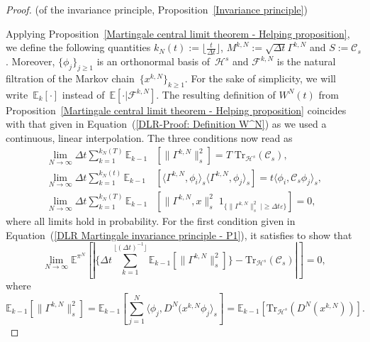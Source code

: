 \begin{proof}(of the invariance principle, Proposition~\ref{Invariance principle})
  
  Applying Proposition~\ref{Martingale central limit theorem - Helping proposition}, we define the following quantities $ k_N(t) := \lfloor \frac{t}{\Delta t} \rfloor $, $ M^{k,N} := \sqrt{\Delta t} \Gamma^{k,N} $ and $ S := \mathcal{C}_s $. Moreover, $\{ \phi_j \}_{j \geq 1}$ is an orthonormal basis of~$\mathcal{H}^s$ and $\mathcal{F}^{k,N}$ is the natural filtration of the Markov chain~$ \{ x^{k,N} \} _{k \geq 1}$. For the sake of simplicity, we will write~$\mathbb{E}_k[\cdot]$ instead of~$\mathbb{E}[\cdot |\mathcal{F}^{k,N}]$.  The resulting definition of $ W^{N}(t) $ from Proposition~\ref{Martingale central limit theorem - Helping proposition} coincides with that given in Equation~(\ref{DLR-Proof: Definition W^N}) as we used a continuous, linear interpolation. The three conditions now read as
    \begin{align}
      \lim_{N \to \infty} \Delta t \sum_{k=1}^{k_{N}(T)} \mathbb{E}_{k-1} &\left[ \| \Gamma^{k,N} \|_{s}^{2}  \right] = T \; \text{Tr}_{\mathcal{H}^s}(\mathcal{C}_s), \label{DLR Martingale invariance principle - P1}\\
      \lim_{N \to \infty} \Delta t \sum_{k=1}^{k_{N}(t)} \mathbb{E}_{k-1} &\left[ \langle  \Gamma^{k,N} , \phi_i \rangle_{s} \langle  \Gamma^{k,N} , \phi_j \rangle_{s}  \right] = t \langle  \phi_i , \mathcal{C}_s \phi_j \rangle_{s}, \label{DLR Martingale invariance principle  - P2}\\
      \lim_{N \to \infty} \Delta t \sum_{k=1}^{k_{N}(T)} \mathbb{E}_{k-1} &\left[\| \Gamma^{k,N} , x \|_{s}^{2} \;  1_{\{ \| \Gamma^{k,N} \|_{s}^{2} \; | \geq \Delta t \varepsilon \}} \right] = 0, \label{DLR Martingale invariance principle  - P3}
  \end{align}
  where all limits hold in probability.  For the first condition given in Equation~(\ref{DLR Martingale invariance principle - P1}), it satisfies to show that
  \begin{equation*}
    \lim_{N \to \infty} \mathbb{E}^{\pi^N} [| \{ \Delta t \sum_{k=1}^{\lfloor (\Delta t)^{-1} \rfloor} \mathbb{E}_{k-1}[\| \Gamma^{k,N} \|_s^2] \} - \text{Tr}_{\mathcal{H}^s}(\mathcal{C}_s) |  ] = 0,
  \end{equation*}
  where
  \begin{equation*}
    \mathbb{E}_{k-1}[\| \Gamma^{k,N} \|_s^2] = \mathbb{E}_{k-1} [ \sum_{j=1}^{N} \langle \phi_j, D^N(x^{k,N}\phi_j \rangle_s  ] = \mathbb{E}_{k-1} [ \text{Tr}_{\mathcal{H}^s} (D^N(x^{k,N})) ].

\end{equation*}
\end{proof}
